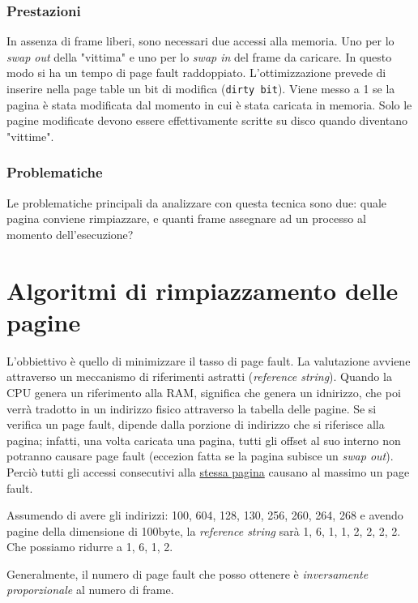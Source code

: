 \documentclass[a4paper,12pt, twoside]{report}
\begin{document}
\subsubsection{Prestazioni}
In assenza di frame liberi, sono necessari due accessi alla memoria. Uno per lo \emph{swap out} della 
"vittima" e uno per lo \emph{swap in} del frame da caricare. In questo modo si ha un tempo di page fault 
raddoppiato. 
L'ottimizzazione prevede di inserire nella page table un bit di modifica (\texttt{dirty bit}). Viene messo
a 1 se la pagina \`e stata modificata dal momento in cui \`e stata caricata in memoria. Solo le pagine 
modificate devono essere effettivamente scritte su disco quando diventano "vittime". 

\subsubsection{Problematiche}
Le problematiche principali da analizzare con questa tecnica sono due: quale pagina conviene rimpiazzare, 
e quanti frame assegnare ad un processo al momento dell'esecuzione?

\section{Algoritmi di rimpiazzamento delle pagine}

L'obbiettivo \`e quello di minimizzare il tasso di page fault. La valutazione avviene attraverso un 
meccanismo di riferimenti astratti (\emph{reference string}). Quando la CPU genera un riferimento alla 
RAM, significa che genera un idnirizzo, che poi verr\`a tradotto in un indirizzo fisico attraverso la 
tabella delle pagine. Se si verifica un page fault, dipende dalla porzione di indirizzo che si riferisce 
alla pagina; infatti, una volta caricata una pagina, tutti gli offset al suo interno non potranno causare
page fault (eccezion fatta se la pagina subisce un \emph{swap out}). Perci\`o tutti gli accessi 
consecutivi alla \underline{stessa pagina} causano al massimo un page fault. 

Assumendo di avere gli indirizzi: 100, 604, 128, 130, 256, 260, 264, 268 e avendo pagine della dimensione 
di 100byte, la \emph{reference string} sar\`a 1, 6, 1, 1, 2, 2, 2, 2. Che possiamo ridurre a 1, 6, 1, 2.


Generalmente, il numero di page fault che posso ottenere \`e \emph{inversamente proporzionale} al numero 
di frame.
\end{document}
